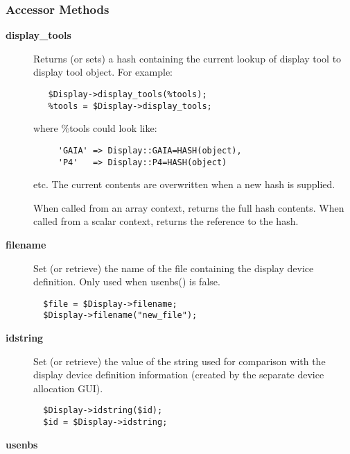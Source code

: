 \subsubsection*{Accessor Methods\label{ORAC::Display_Accessor_Methods}}
\begin{description}

\item[{\textbf{display\_tools}}] \mbox{}

Returns (or sets) a hash containing the current lookup of display tool
to display tool object. For example:

\begin{verbatim}
   $Display->display_tools(%tools);
   %tools = $Display->display_tools;
\end{verbatim}


where \%tools could look like:

\begin{verbatim}
     'GAIA' => Display::GAIA=HASH(object),
     'P4'   => Display::P4=HASH(object)
\end{verbatim}


etc. The current contents are overwritten when a new hash is supplied.



When called from an array context, returns the full hash contents.
When called from a scalar context, returns the reference to the hash.


\item[{\textbf{filename}}] \mbox{}

Set (or retrieve) the name of the file containing the display device
definition. Only used when usenbs() is false.

\begin{verbatim}
  $file = $Display->filename;
  $Display->filename("new_file");
\end{verbatim}

\item[{\textbf{idstring}}] \mbox{}

Set (or retrieve) the value of the string used for comparison
with the display device definition information (created by the
separate device allocation GUI).

\begin{verbatim}
  $Display->idstring($id);
  $id = $Display->idstring;
\end{verbatim}

\item[{\textbf{usenbs}}] \mbox{}


\end{description}
